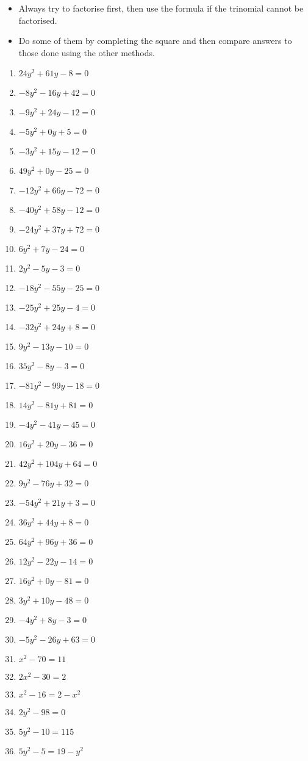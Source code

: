 {\begin{itemize}
\item{Always try to factorise first, then use the formula if the trinomial cannot be factorised.}
\item{Do some of them by completing the square and then compare answers to those done using the other methods.}
\end{itemize}
\begin{multicols}{3}
\begin{enumerate}[label=\textbf{\arabic*}.]
\item $24y^2 + 61y - 8 = 0$ 
\item $-8y^2 - 16y + 42 = 0$
\item $-9y^2 + 24y - 12 = 0$
\item $-5y^2 + 0y + 5 = 0$ 
\item $-3y^2 + 15y - 12 = 0$ 
\item $49y^2 + 0y - 25 = 0$
\item $-12y^2 + 66y - 72 = 0$
\item $-40y^2 + 58y - 12 = 0$ 
\item $-24y^2 + 37y + 72 = 0$
\item $6y^2 + 7y - 24 = 0$ 
\item $2y^2 - 5y - 3 = 0$ 
\item $-18y^2 - 55y - 25 = 0$
\item $-25y^2 + 25y - 4 = 0$ 
\item $-32y^2 + 24y + 8 = 0$ 
\item $9y^2 - 13y - 10 = 0$
\item $35y^2 - 8y - 3 = 0$ 
\item $-81y^2 - 99y - 18 = 0$ 
\item $14y^2 - 81y + 81 = 0$
\item $-4y^2 - 41y - 45 = 0$ 
\item $16y^2 + 20y - 36 = 0$ 
\item $42y^2 + 104y + 64 = 0$
\item $9y^2 - 76y + 32 = 0$ 
\item $-54y^2 + 21y + 3 = 0$ 
\item $36y^2 + 44y + 8 = 0$
\item $64y^2 + 96y + 36 = 0$ 
\item $12y^2 - 22y - 14 = 0$ 
\item $16y^2 + 0y - 81 = 0$
\item $3y^2 + 10y - 48 = 0$ 
\item $-4y^2 + 8y - 3 = 0$ 
\item $-5y^2 - 26y + 63 = 0$
\item $x^2-70=11$ 
\item $2x^2-30=2$ 
\item $x^2-16=2-x^2$
\item $2y^2-98=0$ 
\item $5y^2-10=115$ 
\item $5y^2-5=19-y^2$
\end{enumerate}
\end{multicols}


}
